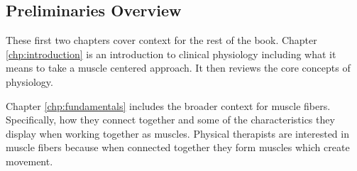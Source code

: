 % 
%
%

\begin{partbacktext}
\part{Preliminaries Overview}
\noindent 


These first two chapters cover context for the rest of the book. Chapter \ref{chp:introduction} is an introduction to clinical physiology including what it means to take a muscle centered approach. It then reviews the core concepts of physiology. 

Chapter \ref{chp:fundamentals} includes the broader context for muscle fibers. Specifically, how they connect together and some of the characteristics they display when working together as muscles. Physical therapists are interested in muscle fibers because when connected together they form muscles which create movement. 
\end{partbacktext}